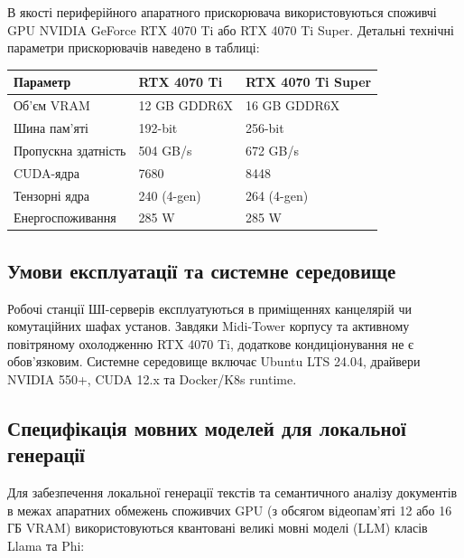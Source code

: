 \documentclass{article}
\begin{document}
В якості периферійного апаратного прискорювача використовуються споживчі GPU NVIDIA GeForce RTX 4070 Ti або RTX 4070 Ti Super. Детальні технічні параметри прискорювачів наведено в таблиці:

\begin{center}
\small
\begin{longtable}{p{4cm} p{5cm} p{5cm}}
\toprule
\textbf{Параметр} & \textbf{RTX 4070 Ti} & \textbf{RTX 4070 Ti Super} \\
\midrule
Об'єм VRAM & 12 GB GDDR6X & 16 GB GDDR6X \\
Шина пам'яті & 192-bit & 256-bit \\
Пропускна здатність & 504 GB/s & 672 GB/s \\
CUDA-ядра & 7680 & 8448 \\
Тензорні ядра & 240 (4-gen) & 264 (4-gen) \\
Енергоспоживання & 285 W & 285 W \\
\bottomrule
\end{longtable}
\end{center}

\subsection{Умови експлуатації та системне середовище}
Робочі станції ШІ-серверів експлуатуються в приміщеннях канцелярій чи комутаційних шафах установ. Завдяки Midi-Tower корпусу та активному повітряному охолодженню RTX 4070 Ti, додаткове кондиціонування не є обов'язковим. Системне середовище включає Ubuntu LTS 24.04, драйвери NVIDIA 550+, CUDA 12.x та Docker/K8s runtime.

\subsection{Специфікація мовних моделей для локальної генерації}

Для забезпечення локальної генерації текстів та семантичного аналізу документів в межах апаратних обмежень споживчих GPU (з обсягом відеопам'яті 12 або 16 ГБ VRAM) використовуються квантовані великі мовні моделі (LLM) класів Llama та Phi:
\end{document}
